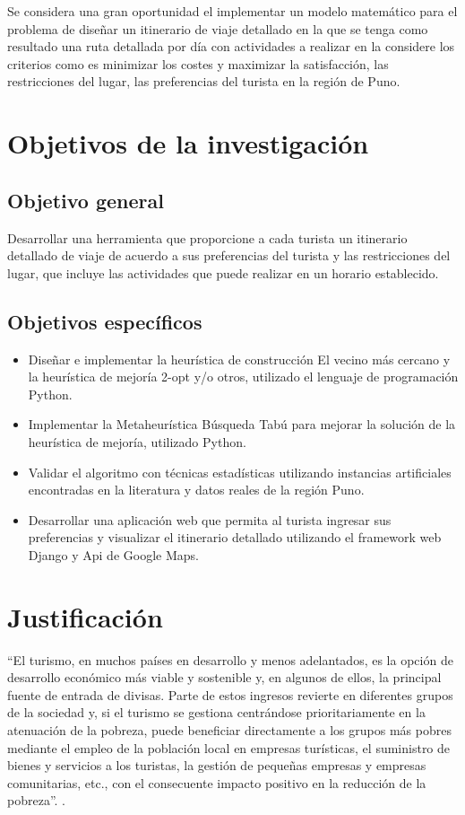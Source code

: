 Se considera una gran oportunidad el implementar un modelo matemático para el problema de diseñar un itinerario de viaje detallado en la que se tenga como resultado una ruta detallada por día con actividades a realizar en la considere los criterios como es minimizar los costes y maximizar la satisfacción, las restricciones del lugar, las preferencias del turista en la región de Puno.

\section{Objetivos de la investigación}

\subsection{Objetivo general}
Desarrollar una herramienta que proporcione a cada turista un itinerario detallado de viaje de acuerdo a sus preferencias del turista y las restricciones del lugar, que incluye las actividades que puede realizar en un horario establecido.

\subsection{Objetivos específicos}
\begin{itemize}
\item Diseñar e implementar la heurística de construcción El vecino más cercano y la heurística de mejoría 2-opt y/o otros, utilizado el lenguaje de programación Python.
\item Implementar la Metaheurística Búsqueda Tabú para mejorar la solución de la heurística de mejoría, utilizado Python.
\item Validar el algoritmo con técnicas estadísticas utilizando instancias artificiales encontradas en la literatura y datos reales de la región Puno.
\item Desarrollar una aplicación web que permita al turista ingresar sus preferencias y visualizar el itinerario detallado utilizando el framework web Django y Api de Google Maps.
\end{itemize}
\section{Justificación}
“El turismo, en muchos países en desarrollo y menos adelantados, es la opción de desarrollo económico más viable y sostenible y, en algunos de ellos, la principal fuente de entrada de divisas. Parte de estos ingresos revierte en diferentes grupos de la sociedad y, si el turismo se gestiona centrándose prioritariamente en la atenuación de la pobreza, puede beneficiar directamente a los grupos más pobres mediante el empleo de la población local en empresas turísticas, el suministro de bienes y servicios a los turistas, la gestión de pequeñas empresas y empresas comunitarias, etc., con el consecuente impacto positivo en la reducción de la pobreza”. \cite{ElPobreza}.

